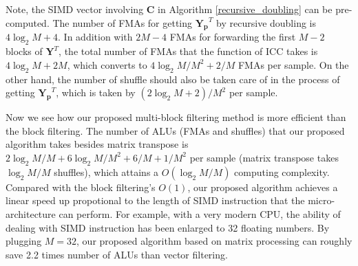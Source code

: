 

Note, the SIMD vector involving $\bm{C}$ in Algorithm \ref{recursive_doubling} can be pre-computed.
The number of FMAs for getting $\bm{Y_p}^T$ by recursive doubling is $4\log_2M+4$. In addition with $2M-4$ FMAs for forwarding the first $M{-}2$ blocks of $\bm{Y}^T$,
the total number of FMAs that the function of ICC takes is $4\log_2M+2M$, which converts to $4\log_2M/M^2{+}2/M$ FMAs per sample.
On the other hand, the number of shuffle should also be taken care of in the process of getting $\bm{Y_p}^T$,
which is taken by $(2\log_2M+2)/M^2$ per sample.

Now we see how our proposed multi-block filtering method is more efficient than the block filtering. The number of ALUs (FMAs and shuffles) that our proposed algorithm takes
besides matrix transpose is $2\log_2M/M+6\log_2M/M^2+6/M+1/M^2$ per sample (matrix transpose takes $\log_2M/M$ shuffles), which
attains a $O(\log_2M/M)$ computing complexity. Compared with the block filtering's $O(1)$, our proposed algorithm
achieves a linear speed up propotional to the length of SIMD instruction that the micro-architecture can perform.
For example, with a very modern CPU, the ability of dealing with SIMD instruction has been enlarged to 32 floating numbers. By plugging $M=32$,
our proposed algorithm based on matrix processing can roughly save 2.2 times number of ALUs than vector filtering.


